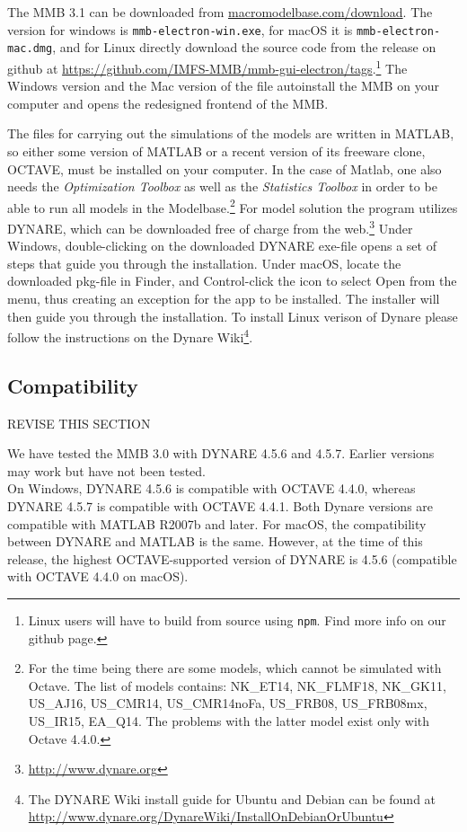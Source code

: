 The MMB 3.1 can be downloaded from \url{macromodelbase.com/download}. The version for windows is \texttt{mmb-electron-win.exe}, for macOS it is \texttt{mmb-electron-mac.dmg}, and for Linux directly download the source code from the release on github at
\url{https://github.com/IMFS-MMB/mmb-gui-electron/tags}.\footnote{Linux users will have to build from source using \texttt{npm}. Find more info on our github page.}
The Windows version and the Mac version of the file autoinstall the MMB on your computer and opens the redesigned frontend of the MMB. 

The files for carrying out the simulations of the models are written in MATLAB, so either some version of MATLAB or a recent version of its freeware clone, OCTAVE, must be installed on your computer. In the case of Matlab, one also needs the \textit{Optimization Toolbox} as well as the \textit{Statistics Toolbox} in order to be able to run all models in the Modelbase.\footnote{For the time being there are some models, which cannot be simulated with Octave. The list of models contains: NK\_ET14, NK\_FLMF18, NK\_GK11, US\_AJ16, US\_CMR14, US\_CMR14noFa, US\_FRB08, US\_FRB08mx, US\_IR15, EA\_Q14. The problems with the latter model exist only with Octave 4.4.0.}
For model solution the program utilizes DYNARE, which can be downloaded free of charge from the web.\footnote{\url{http://www.dynare.org}} Under Windows, double-clicking on the downloaded DYNARE exe-file opens a set of steps that guide you through the installation. Under macOS, locate the downloaded pkg-file in Finder, and Control-click the icon to select Open from the menu, thus creating an exception for the app to be installed. The installer will then guide you through the installation. To install Linux verison of Dynare please follow the instructions on the Dynare Wiki\footnote{The DYNARE Wiki install guide for Ubuntu and Debian can be found at \url{http://www.dynare.org/DynareWiki/InstallOnDebianOrUbuntu}}.

\subsection*{Compatibility}

REVISE THIS SECTION

We have tested the MMB 3.0 with DYNARE 4.5.6 and 4.5.7. Earlier versions may work but have not been tested.\\
On Windows, DYNARE 4.5.6 is compatible with OCTAVE 4.4.0, whereas DYNARE 4.5.7 is compatible with OCTAVE 4.4.1. Both Dynare versions are compatible with  MATLAB R2007b and later. For macOS, the compatibility between DYNARE and MATLAB is the same. However, at the time of this release, the highest OCTAVE-supported version of DYNARE is 4.5.6 (compatible with OCTAVE 4.4.0 on macOS).\\


